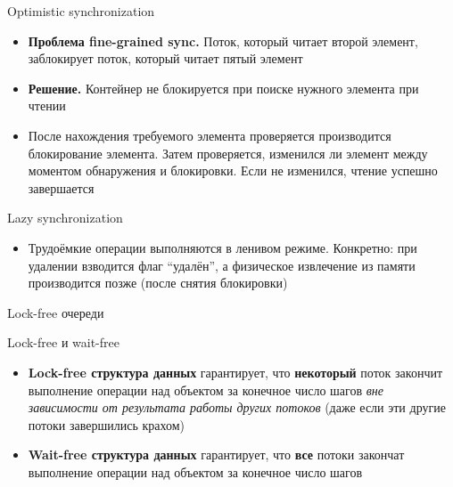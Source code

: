 \documentclass[14pt]{beamer}
\begin{document}
	\begin{frame}{Optimistic synchronization}
		\begin{itemize}
			\item \textbf{Проблема fine-grained sync.} Поток, который читает второй элемент, заблокирует поток, который читает пятый элемент
			\item \textbf{Решение.} Контейнер не блокируется при поиске нужного элемента при чтении
			\item После нахождения требуемого элемента проверяется производится блокирование элемента. Затем проверяется, изменился ли элемент между моментом обнаружения и блокировки. Если не изменился, чтение успешно завершается
		\end{itemize}
	\end{frame}

	\begin{frame}{Lazy synchronization}
		\begin{itemize}
			\item Трудоёмкие операции выполняются в ленивом режиме. Конкретно: при удалении взводится флаг ``удалён'', а физическое извлечение из памяти производится позже (после снятия блокировки)
		\end{itemize}
	\end{frame}

	\begin{frame}
		\begin{center}
			\Large{Lock-free очереди}
		\end{center}
	\end{frame}

	\begin{frame}{Lock-free и wait-free}
		\begin{itemize}
			\item \textbf{Lock-free структура данных}  гарантирует, что \textbf{некоторый} поток закончит выполнение операции над объектом за конечное число шагов \textit{вне зависимости от результата работы других потоков} (даже если эти другие потоки завершились крахом)
			
			\item \textbf{Wait-free структура данных}  гарантирует, что \textbf{все} потоки закончат выполнение операции над объектом за конечное число шагов
		\end{itemize}
	\end{frame}
\end{document}
